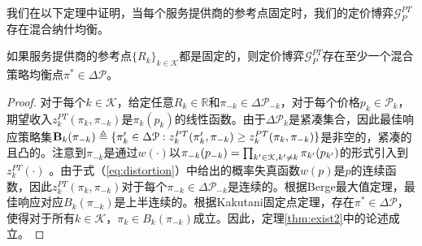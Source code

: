 我们在以下定理中证明，当每个服务提供商的参考点固定时，我们的定价博弈$\mathcal{G}_{P}^{PT}$存在混合纳什均衡。
\begin{thm}\label{thm:exist2}
如果服务提供商的参考点$\{R_k\}_{k\in\mathcal{K}}$都是固定的，则定价博弈$\mathcal{G}^{PT}_{P}$存在至少一个混合策略均衡点$\pi^{*}\in\Delta\mathcal{P}$。
\end{thm}
\begin{proof}
对于每个$k\in\mathcal{K}$，给定任意$R_k\in \mathbb{R}$和$\pi_{-k}\in\Delta\mathcal{P}_{-k}$，对于每个价格$p_k\in\mathcal{P}_k$，期望收入$z_{k}^{PT}(\pi_k, \pi_{-k})$是$\pi_k(p_k)$的线性函数。由于$\Delta\mathcal{P}_{k}$是紧凑集合，因此最佳响应策略集$\bold{B}_k(\pi_{-k})\triangleq\{\pi'_k\in\Delta\mathcal{P}:z_{k}^{PT}(\pi'_k, \pi_{-k})\geq z_{k}^{PT}(\pi_k, \pi_{-k})\}$是非空的，紧凑的且凸的。注意到$\pi_{-k}$是通过$w(\cdot)$以$\pi_{-k}(p_{-k})=\prod_{k'\in\mathcal{K}, k'\neq k}\pi_{k'}(p_{k'})$的形式引入到$z_{k}^{PT}(\cdot)$ 。由于式（\ref{eq:distortion}）中给出的概率失真函数$w(p)$是$p$的连续函数，因此$z_{k}^{PT}(\pi_k, \pi_{-k})$对于每个$\pi_{-k}\in\Delta\mathcal{P}_{-k}$是连续的。根据Berge最大值定理，最佳响应对应$B_k(\pi_{-k})$是上半连续的。根据Kakutani固定点定理，存在$\pi^*\in\Delta\mathcal{P}$，使得对于所有$k\in\mathcal{K}$，$\pi_k\in B_k(\pi_{-k})$成立。因此，定理\ref{thm:exist2}中的论述成立。
\end{proof}


